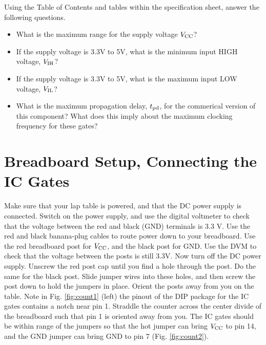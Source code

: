 \documentclass{article}
\begin{document}
\noindent
Using the Table of Contents and tables within the specification sheet, answer the following questions.
\begin{itemize}
\item What is the maximum range for the supply voltage $V_{\rm CC}$? \vspace{0.25cm}
\item If the supply voltage is 3.3V to 5V, what is the minimum input HIGH voltage, $V_{\rm IH}$? \vspace{0.25cm}
\item If the supply voltage is 3.3V to 5V, what is the maximum input LOW voltage, $V_{\rm IL}$? \vspace{0.25cm}
\item What is the maximum propagation delay, $t_{\rm pd}$, for the commerical version of this component?  What does this imply about the maximum clocking frequency for these gates?  \vspace{0.25cm}
\end{itemize}

\section{Breadboard Setup, Connecting the IC Gates}

Make sure that your lap table is powered, and that the DC power supply is connected.  Switch on the power supply, and use the digital voltmeter to check that the voltage between the red and black (GND) terminals is 3.3 V.  Use the red and black banana-plug cables to route power down to your breadboard.  Use the red breadboard post for $V_{\rm CC}$, and the black post for GND.  Use the DVM to check that the voltage between the posts is still 3.3V.  Now turn off the DC power supply.  Unscrew the red post cap until you find a hole through the post.  Do the same for the black post.  Slide jumper wires into these holes, and then screw the post down to hold the jumpers in place.  Orient the posts away from you on the table.  Note in Fig. \ref{fig:count1} (left) the pinout of the DIP package for the IC gates contains a notch near pin 1.  Straddle the counter across the center divide of the breadboard such that pin 1 is oriented away from you.  The IC gates should be within range of the jumpers so that the hot jumper can bring $V_{\rm CC}$ to pin 14, and the GND jumper can bring GND to pin 7 (Fig. \ref{fig:count2}).
\end{document}
